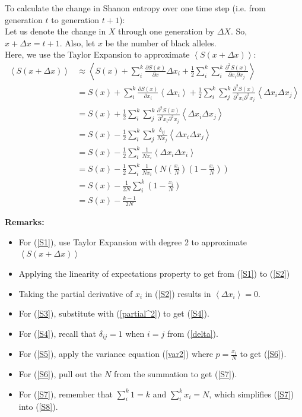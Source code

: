 \documentclass[12pt]{extarticle}
\newcommand{\<}{\langle}
\renewcommand{\>}{\rangle}
\theoremstyle{definition}
\begin{document}
\noindent To calculate the change in Shanon entropy over one time step (i.e. from generation $t$ to generation $t + 1$):\\

\noindent Let us denote the change in $X$ through one generation by $\Delta X$. So, $x + \Delta x = t + 1$. Also, let $x$ be the number of black alleles.\\

\noindent Here, we use the Taylor Expansion to approximate $\left< S(x + \Delta x) \right>$:
\begin{align}
    \left< S(x + \Delta x) \right> &\approx  \left<S(x) + \sum_i^k \frac{\partial S(x)}{\partial x}\Delta x_i + \frac{1}{2}\sum_i^k \sum_i^k \frac{\partial^2 S(x)}{\partial x_i \partial x_j} \right> \label{S1} \\
    &= S(x) + \sum_i^k \frac{\partial S(x)}{\partial x_i} \left< \Delta x_i \right> + \frac{1}{2}\sum_i^k \sum_j^k \frac{\partial^2 S(x)}{\partial^2 x_i \partial^2 x_j} \left< \Delta x_i \Delta x_j \right> \label{S2} \\
    &= S(x) + \frac{1}{2}\sum_i^k \sum_j^k \frac{\partial^2 S(x)}{\partial^2 x_i \partial^2 x_j} \left< \Delta x_i \Delta x_j \right> \label{S3} \\
    &= S(x) - \frac{1}{2}\sum_i^k \sum_j^k \frac{\delta_{ij}}{Nx_j} \left< \Delta x_i \Delta x_j \right> \label{S4} \\
    &= S(x) - \frac{1}{2}\sum_i^k \frac{1}{Nx_i} \left< \Delta x_i \Delta x_i \right> \label{S5} \\
    &= S(x) - \frac{1}{2}\sum_i^k \frac{1}{Nx_i} \left(N(\frac{x_i}{N})(1 - \frac{x_i}{N})\right) \label{S6} \\
    &= S(x) - \frac{1}{2N}\sum_i^k(1 - \frac{x_i}{N}) \label{S7} \\
    &= S(x) - \frac{k - 1}{2N} \label{S8}
\end{align}

\noindent \textbf{Remarks:}
\begin{itemize}
    \item For (\ref{S1}), use Taylor Expansion with degree 2 to approximate $\left< S(x + \Delta x) \right>$
    \item Applying the linearity of expectations property to get from (\ref{S1}) to (\ref{S2})
    \item Taking the partial derivative of $x_i$ in (\ref{S2}) results in $\left< \Delta x_i \right> = 0$.
    \item For (\ref{S3}), substitute with (\ref{partial^2}) to get (\ref{S4}).
    \item For (\ref{S4}), recall that $\delta_{ij} = 1$ when $i = j$ from (\ref{delta}).
    \item For (\ref{S5}), apply the variance equation (\ref{var2}) where $p = \frac{x_i}{N}$ to get (\ref{S6}).
    \item For (\ref{S6}), pull out the $N$ from the summation to get (\ref{S7}).
    \item For (\ref{S7}), remember that $\sum_i^k 1 = k$ and $\sum_i^k x_i = N$, which simplifies (\ref{S7}) into (\ref{S8}).
\end{itemize}
\end{document}
